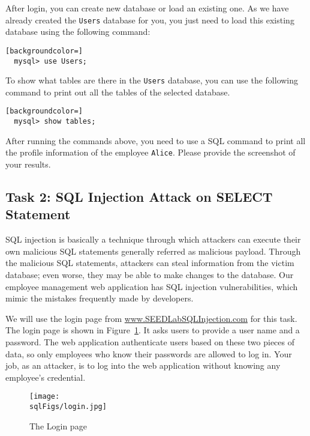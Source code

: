 After login, you can create new database or load an existing
one. As we have already created the {\tt Users} database for you, you just
need to load this existing database using the following command: 

\begin{lstlisting}[backgroundcolor=]
  mysql> use Users;
\end{lstlisting}


To show what tables are there in the {\tt Users} database, 
you can use the following command to print out all the tables of the
selected database.

\begin{lstlisting}[backgroundcolor=]
  mysql> show tables;
\end{lstlisting}


After running the commands above, you need to use 
a SQL command to print all the profile information of
the employee {\tt Alice}. Please provide the screenshot of your results.





\subsection{Task 2: SQL Injection Attack on SELECT Statement} 


SQL injection is basically a technique through
which attackers can execute their own malicious SQL statements generally
referred as malicious payload. Through the malicious SQL statements, 
attackers can steal information from the victim database; even worse,
they may be able to make changes to the database. Our employee
management web application has SQL injection vulnerabilities, which mimic 
the mistakes frequently made by developers. 

We will use the login page from \url{www.SEEDLabSQLInjection.com}
for this task. The login page is shown in Figure~\ref{sql:fig:login}. 
It asks users to provide a user name and a password.
The web application authenticate users based on these two pieces 
of data, so only employees who know their 
passwords are allowed to log in.
Your job, as an attacker, is to log into the web application without knowing
any employee's credential. 


\begin{figure}[htb]
\begin{center}
\texttt{[image: \\sqlFigs/login.jpg]}
\end{center}
\caption{The Login page}
\label{sql:fig:login}
\end{figure}
 

